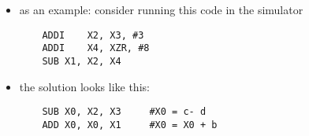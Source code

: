 \begin{frame}[fragile]
\BNotes\ifnum{}
\begin{itemize}
\item as an example: consider running this code in the simulator
\begin{verbatim}
    ADDI	X2, X3, #3
	ADDI	X4, XZR, #8
	SUB	X1, X2, X4
\end{verbatim}
\item the solution looks like this:
\begin{verbatim}
    SUB X0, X2, X3     #X0 = c- d
    ADD X0, X0, X1     #X0 = X0 + b
\end{verbatim}
    

\end{itemize}
\fi

\end{frame}

